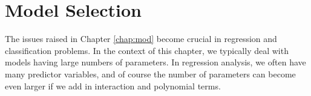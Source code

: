 % 
% 
% 
% 
% 
% 
% 


% 
% 

\section{Model Selection}
\label{regmodsel}

The issues raised in Chapter \ref{chap:mod} become crucial in regression
and classification problems.  In the context of this chapter, we
typically deal with models having large numbers of parameters.  In
regression analysis, we often have many predictor variables, and of
course the number of parameters can become even larger if we add in
interaction and polynomial terms.

